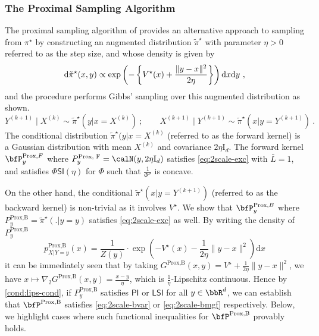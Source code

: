 \documentclass[11pt]{article}
\newcounter{ct}
\newcommand{\rmd}{\mathrm{d}}
\newcommand{\rmI}{\mathrm{I}}
\newcommand{\potential}[1]{
    \ensuremath{\if$#1$V\else V(#1)\fi}
}
\newcommand{\PhiSI}[1]{\Phi\mathsf{SI}\left(#1\right)}
\begin{document}
\subsubsection{The Proximal Sampling Algorithm}

The proximal sampling algorithm of \citet{lee2021structured} provides an alternative approach to sampling from \(\pi^{\star}\) by constructing an augmented distribution \(\tilde{\pi}^{\star}\) with parameter \(\eta > 0\) referred to as the step size, and whose density is given by
\begin{equation*}
    \rmd\tilde{\pi}^{\star}(x, y) \propto \exp\left(-\left\{\potential{}^{\star}(x) + \frac{\|y - x\|^{2}}{2\eta}\right\}\right)\rmd x\rmd y~,
\end{equation*}
and the procedure performs Gibbs' sampling over this augmented distribution as shown.
\begin{equation*}
    Y^{(k + 1)} \mid X^{(k)} \sim \tilde{\pi}^{\star}(y | x = X^{(k)})~; \qquad X^{(k + 1)} \mid Y^{(k + 1)} \sim \tilde{\pi}^{\star}(x | y = Y^{(k + 1)})~.
\end{equation*}
The conditional distribution \(\tilde{\pi}^{\star}(y | x = X^{(k)}\) (referred to as the forward kernel) is a Gaussian distribution with mean \(X^{(k)}\) and covariance \(2\eta \rmI_{d}\).
The forward kernel \(\bfP^{\text{Prox},F}_{y}\) where \(P_{y}^{\text{Prox, F}} = \calN(y, 2\eta \rmI_{d})\) satisfies \ref{eq:2scale-exc} with \(\bar{L} = 1\), and satisfies \(\PhiSI{\eta}\) for \(\Phi\) such that \(\frac{1}{\Phi''}\) is concave.

On the other hand, the conditional \(\tilde{\pi}^{\star}(x | y= Y^{(k + 1)})\) (referred to as the backward kernel) is non-trivial as it involves \(V^{\star}\).
We show that \(\bfP^{\text{Prox},B}_{y}\) where \(P_{y}^{\text{Prox,B}} = \widetilde{\pi}^{\star}(. | y = y)\) satisfies \ref{eq:2scale-exc} as well.
By writing the density of \(P_{y}^{\text{Prox,B}}\)
\begin{equation*}
    p_{X | Y = y}^{\text{Prox,B}}(x) = \frac{1}{Z(y)} \cdot \exp\left(-V^{\star}(x) - \frac{1}{2\eta}\|y - x\|^{2}\right)\rmd x
\end{equation*}
it can be immediately seen that by taking \(G^{\text{Prox,B}}(x, y) = V^{\star} + \frac{1}{2\eta}\|y- x\|^{2}\), we have
\(x\mapsto \nabla_{2}G^{\text{Prox,B}}(x, y) = \frac{x - y}{\eta}\), which is \(\frac{1}{\eta}\)-Lipschitz continuous.
Hence by \ref{cond:lips-cond}, if \(P^{\text{Prox,B}}_{y}\) satisfies \(\mathsf{PI}\) or \(\mathsf{LSI}\) for all \(y \in \bbR^{d}\), we can establish that \(\bfP^{\text{Prox,B}}\) satisfies \ref{eq:2scale-bvar} or \ref{eq:2scale-bmgf} respectively.
Below, we highlight cases where such functional inequalities for \(\bfP^{\text{Prox,B}}\) provably holds.
\end{document}
